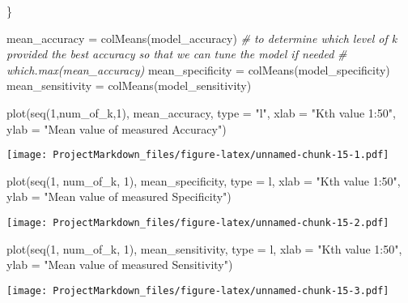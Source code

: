 \documentclass[
]{article}
\newenvironment{Shaded}{\begin{snugshade}}{\end{snugshade}}
\newcommand{\AttributeTok}[1]{\textcolor[rgb]{0.77,0.63,0.00}{#1}}
\newcommand{\CommentTok}[1]{\textcolor[rgb]{0.56,0.35,0.01}{\textit{#1}}}
\newcommand{\DecValTok}[1]{\textcolor[rgb]{0.00,0.00,0.81}{#1}}
\newcommand{\FunctionTok}[1]{\textcolor[rgb]{0.00,0.00,0.00}{#1}}
\newcommand{\NormalTok}[1]{#1}
\newcommand{\OtherTok}[1]{\textcolor[rgb]{0.56,0.35,0.01}{#1}}
\newcommand{\StringTok}[1]{\textcolor[rgb]{0.31,0.60,0.02}{#1}}
\begin{document}
\begin{Shaded}
\begin{Highlighting}[]
  
\NormalTok{\}}

\NormalTok{mean\_accuracy }\OtherTok{=} \FunctionTok{colMeans}\NormalTok{(model\_accuracy)}
\CommentTok{\# to determine which level of k provided the best accuracy so that we can tune the model if needed}
\CommentTok{\# which.max(mean\_accuracy)}
\NormalTok{mean\_specificity }\OtherTok{=} \FunctionTok{colMeans}\NormalTok{(model\_specificity)}
\NormalTok{mean\_sensitivity }\OtherTok{=} \FunctionTok{colMeans}\NormalTok{(model\_sensitivity)}

\FunctionTok{plot}\NormalTok{(}\FunctionTok{seq}\NormalTok{(}\DecValTok{1}\NormalTok{,num\_of\_k,}\DecValTok{1}\NormalTok{),}
\NormalTok{     mean\_accuracy, }\AttributeTok{type =} \StringTok{"l"}\NormalTok{,}
     \AttributeTok{xlab =} \StringTok{"Kth value 1:50"}\NormalTok{,}
     \AttributeTok{ylab =} \StringTok{"Mean value of measured Accuracy"}\NormalTok{)}
\end{Highlighting}
\end{Shaded}

\texttt{[image: ProjectMarkdown\_files/figure-latex/unnamed-chunk-15-1.pdf]}

\begin{Shaded}
\begin{Highlighting}[]
\FunctionTok{plot}\NormalTok{(}\FunctionTok{seq}\NormalTok{(}\DecValTok{1}\NormalTok{, num\_of\_k, }\DecValTok{1}\NormalTok{),}
\NormalTok{     mean\_specificity,}
     \AttributeTok{type =} \StringTok{\textquotesingle{}l\textquotesingle{}}\NormalTok{,}
     \AttributeTok{xlab =} \StringTok{"Kth value 1:50"}\NormalTok{,}
     \AttributeTok{ylab =} \StringTok{"Mean value of measured Specificity"}\NormalTok{)}
\end{Highlighting}
\end{Shaded}

\texttt{[image: ProjectMarkdown\_files/figure-latex/unnamed-chunk-15-2.pdf]}

\begin{Shaded}
\begin{Highlighting}[]
\FunctionTok{plot}\NormalTok{(}\FunctionTok{seq}\NormalTok{(}\DecValTok{1}\NormalTok{, num\_of\_k, }\DecValTok{1}\NormalTok{),}
\NormalTok{     mean\_sensitivity, }\AttributeTok{type =} \StringTok{\textquotesingle{}l\textquotesingle{}}\NormalTok{,}
     \AttributeTok{xlab =} \StringTok{"Kth value 1:50"}\NormalTok{,}
     \AttributeTok{ylab =} \StringTok{"Mean value of measured Sensitivity"}\NormalTok{)}
\end{Highlighting}
\end{Shaded}

\texttt{[image: ProjectMarkdown\_files/figure-latex/unnamed-chunk-15-3.pdf]}
\end{document}

